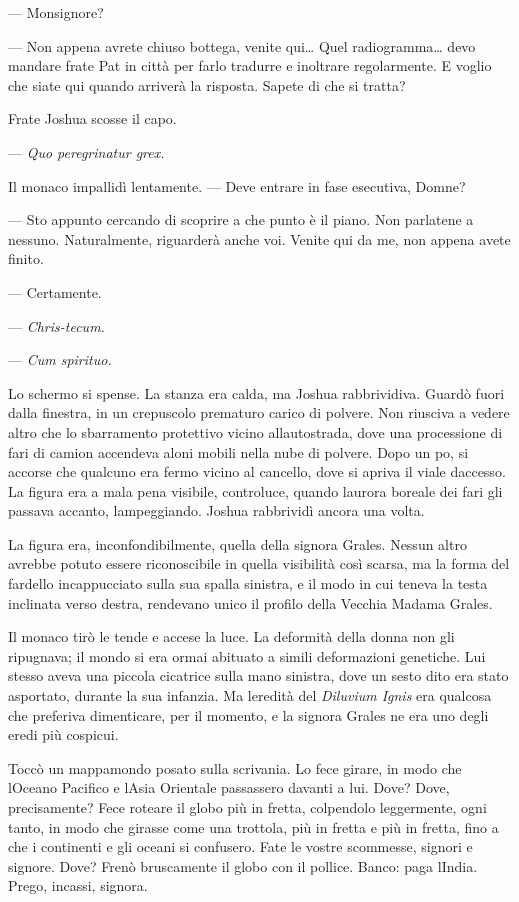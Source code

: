 	--- Monsignore?
	
	--- Non appena avrete chiuso bottega, venite qui\ldots{} Quel
	radiogramma\ldots{} devo mandare frate Pat in città per farlo tradurre e
	inoltrare regolarmente. E voglio che siate qui quando arriverà la
	risposta. Sapete di che si tratta?
	
	Frate Joshua scosse il capo.
	
	--- \emph{Quo peregrinatur grex.}
	
	Il monaco impallidì lentamente. --- Deve entrare in fase esecutiva,
	Domne?
	
	--- Sto appunto cercando di scoprire a che punto è il piano. Non
	parlatene a nessuno. Naturalmente, riguarderà anche voi. Venite qui da
	me, non appena avete finito.
	
	--- Certamente.
	
	--- \emph{Chris-tecum.}
	
	--- \emph{Cum spiri\textquotesingle tuo.}
	
	Lo schermo si spense. La stanza era calda, ma Joshua rabbrividiva.
	Guardò fuori dalla finestra, in un crepuscolo prematuro carico di
	polvere. Non riusciva a vedere altro che lo sbarramento protettivo
	vicino all\textquotesingle autostrada, dove una processione di fari di
	camion accendeva aloni mobili nella nube di polvere. Dopo un
	po\textquotesingle, si accorse che qualcuno era fermo vicino al
	cancello, dove si apriva il viale d\textquotesingle accesso. La figura
	era a mala pena visibile, controluce, quando l\textquotesingle aurora
	boreale dei fari gli passava accanto, lampeggiando. Joshua rabbrividì
	ancora una volta.
	
	La figura era, inconfondibilmente, quella della signora Grales. Nessun
	altro avrebbe potuto essere riconoscibile in quella visibilità così
	scarsa, ma la forma del fardello incappucciato sulla sua spalla
	sinistra, e il modo in cui teneva la testa inclinata verso destra,
	rendevano unico il profilo della Vecchia Madama Grales.
	
	Il monaco tirò le tende e accese la luce. La deformità della donna non
	gli ripugnava; il mondo si era ormai abituato a simili deformazioni
	genetiche. Lui stesso aveva una piccola cicatrice sulla mano sinistra,
	dove un sesto dito era stato asportato, durante la sua infanzia. Ma
	l\textquotesingle eredità del \emph{Diluvium Ignis} era qualcosa che
	preferiva dimenticare, per il momento, e la signora Grales ne era uno
	degli eredi più cospicui.
	
	Toccò un mappamondo posato sulla scrivania. Lo fece girare, in modo che
	l\textquotesingle Oceano Pacifico e l\textquotesingle Asia Orientale
	passassero davanti a lui. Dove? Dove, precisamente? Fece roteare il
	globo più in fretta, colpendolo leggermente, ogni tanto, in modo che
	girasse come una trottola, più in fretta e più in fretta, fino a che i
	continenti e gli oceani si confusero. Fate le vostre scommesse, signori
	e signore. Dove? Frenò bruscamente il globo con il pollice. Banco: paga
	l\textquotesingle India. Prego, incassi, signora.
	
